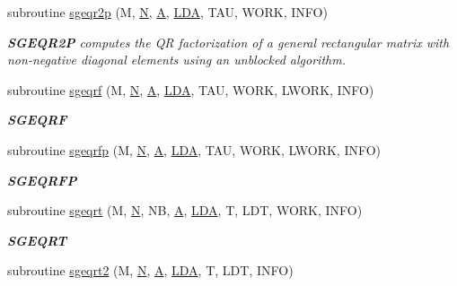 \begin{DoxyCompactItemize}
subroutine \hyperlink{group__realGEcomputational_ga8979d77a9ad2c9791bd813c2fe3f954e}{sgeqr2p} (M, \hyperlink{polmisc_8c_a0240ac851181b84ac374872dc5434ee4}{N}, \hyperlink{classA}{A}, \hyperlink{example__user_8c_ae946da542ce0db94dced19b2ecefd1aa}{L\+D\+A}, T\+A\+U, W\+O\+R\+K, I\+N\+F\+O)
\begin{DoxyCompactList}\small\item\em {\bfseries S\+G\+E\+Q\+R2\+P} computes the Q\+R factorization of a general rectangular matrix with non-\/negative diagonal elements using an unblocked algorithm. \end{DoxyCompactList}\item 
subroutine \hyperlink{group__realGEcomputational_ga7cb54fa1727bf0166523036f4948bc56}{sgeqrf} (M, \hyperlink{polmisc_8c_a0240ac851181b84ac374872dc5434ee4}{N}, \hyperlink{classA}{A}, \hyperlink{example__user_8c_ae946da542ce0db94dced19b2ecefd1aa}{L\+D\+A}, T\+A\+U, W\+O\+R\+K, L\+W\+O\+R\+K, I\+N\+F\+O)
\begin{DoxyCompactList}\small\item\em {\bfseries S\+G\+E\+Q\+R\+F} \end{DoxyCompactList}\item 
subroutine \hyperlink{group__realGEcomputational_ga3b9e414215d20cd99cbd3be489989a96}{sgeqrfp} (M, \hyperlink{polmisc_8c_a0240ac851181b84ac374872dc5434ee4}{N}, \hyperlink{classA}{A}, \hyperlink{example__user_8c_ae946da542ce0db94dced19b2ecefd1aa}{L\+D\+A}, T\+A\+U, W\+O\+R\+K, L\+W\+O\+R\+K, I\+N\+F\+O)
\begin{DoxyCompactList}\small\item\em {\bfseries S\+G\+E\+Q\+R\+F\+P} \end{DoxyCompactList}\item 
subroutine \hyperlink{group__realGEcomputational_ga036c4a8fce2027da4ed92cf9064e8819}{sgeqrt} (M, \hyperlink{polmisc_8c_a0240ac851181b84ac374872dc5434ee4}{N}, N\+B, \hyperlink{classA}{A}, \hyperlink{example__user_8c_ae946da542ce0db94dced19b2ecefd1aa}{L\+D\+A}, T, L\+D\+T, W\+O\+R\+K, I\+N\+F\+O)
\begin{DoxyCompactList}\small\item\em {\bfseries S\+G\+E\+Q\+R\+T} \end{DoxyCompactList}\item 
subroutine \hyperlink{group__realGEcomputational_ga418228a8d0645cee0ff6a89a3b9a8e19}{sgeqrt2} (M, \hyperlink{polmisc_8c_a0240ac851181b84ac374872dc5434ee4}{N}, \hyperlink{classA}{A}, \hyperlink{example__user_8c_ae946da542ce0db94dced19b2ecefd1aa}{L\+D\+A}, T, L\+D\+T, I\+N\+F\+O)

\end{DoxyCompactItemize}
